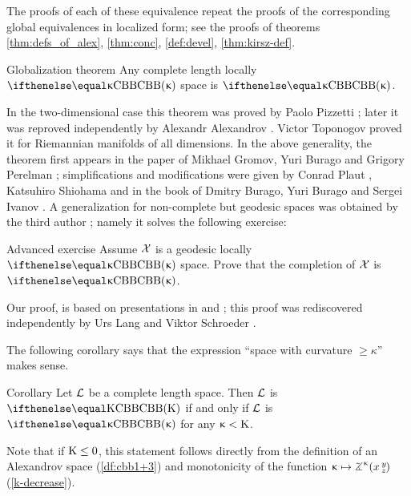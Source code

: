 The proofs of each of these equivalence repeat the proofs of the corresponding global equivalences in localized form; see the proofs of theorems \ref{thm:defs_of_alex}, \ref{thm:conc}, \ref{def:devel}, \ref{thm:kirsz-def}.


\begin{thm}{Globalization theorem}\label{thm:glob} 
Any complete length locally $\Alex\kappa$ space is $\Alex\kappa$.
\end{thm}

{\sloppy

In the two-dimensional case this theorem was proved by Paolo Pizzetti \cite{pizzetti};
later it was reproved independently by Alexandr Alexandrov \cite{alexandrov:devel}.%
Victor Toponogov \cite{toponogov-globalization+splitting} proved it for Riemannian manifolds of all dimensions.
In the above generality, the theorem first appears in the paper of Mikhael Gromov, Yuri Burago and Grigory Perelman \cite{burago-gromov-perelman}; 
simplifications and modifications were given by Conrad Plaut \cite{plaut:dimension}, Katsuhiro Shiohama \cite{shiohama} and in the book of Dmitry Burago, Yuri Burago and Sergei Ivanov \cite{burago-burago-ivanov}.
A generalization for non-complete but geodesic spaces was obtained by the third author \cite{petrunin:globalization}; namely it solves the following exercise:

}

\begin{thm}{Advanced exercise}\label{ex:noncomplete-globalization}
Assume $\mathcal{X}$ is a geodesic locally  $\Alex\kappa$ space. 
Prove that the completion of $\mathcal{X}$ is $\Alex\kappa$.
\end{thm}

Our proof, is based on presentations in \cite{plaut:dimension} and \cite{burago-burago-ivanov};
this proof was rediscovered independently by Urs Lang and Viktor Schroeder \cite{lang-schroeder:globalization}.

The following corollary says that the expression ``space with curvature $\ge \kappa$'' makes sense.

\begin{thm}{Corollary}\label{cor:CAT>k-sence}
Let $\mathcal{L}$ be a complete length space.
Then $\mathcal{L}$ is $\Alex\Kappa$ if and only if $\mathcal{L}$ is $\Alex\kappa$ for any $\upkappa<\mathrm{K}$.
\end{thm}

Note that if $\Kappa\le 0$, this statement follows directly from the  definition of an Alexandrov space (\ref{df:cbb1+3}) and monotonicity of the function $\kappa\mapsto\angk\kappa x y z$ (\ref{k-decrease}).

